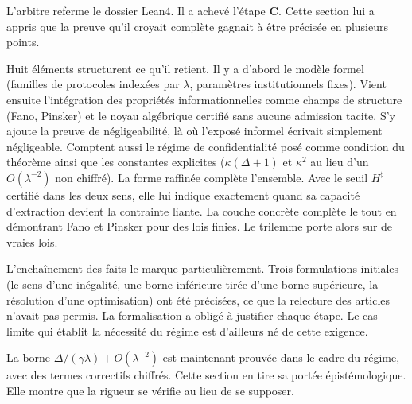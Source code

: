 \begin{boiteArbitre}
L'arbitre referme le dossier Lean4. Il a achev\'e l'\'etape \textbf{C}.
Cette section lui a appris que la preuve qu'il croyait compl\`ete gagnait
\`a \^etre pr\'ecis\'ee en plusieurs points.

Huit \'el\'ements structurent ce qu'il retient. Il y a d'abord le mod\`ele formel
(familles de protocoles index\'ees par $\lambda$, param\`etres institutionnels
fixes). Vient ensuite l'int\'egration des propri\'et\'es informationnelles comme champs de
structure (Fano, Pinsker) et le noyau alg\'ebrique certifi\'e sans aucune
admission tacite. S'y ajoute la preuve de n\'egligeabilit\'e, l\`a o\`u l'expos\'e
informel \'ecrivait simplement \og n\'egligeable\fg. Comptent aussi le r\'egime de confidentialit\'e
pos\'e comme condition du th\'eor\`eme ainsi que les constantes explicites
($\kappa(\Delta+1)$ et $\kappa^2$ au lieu d'un $O(\lambda^{-2})$ non chiffr\'e). La
forme raffin\'ee compl\`ete l'ensemble. Avec le seuil $H^\sharp$ certifi\'e dans les deux
sens, elle lui indique exactement quand sa capacit\'e
d'extraction devient la contrainte liante. La couche concr\`ete compl\`ete le tout en
d\'emontrant Fano et Pinsker pour des lois finies. Le trilemme porte alors sur
de vraies lois.

L'encha\^inement des faits le marque particuli\`erement. Trois formulations
initiales (le sens d'une in\'egalit\'e, une borne inf\'erieure tir\'ee d'une borne
sup\'erieure, la r\'esolution d'une optimisation) ont \'et\'e pr\'ecis\'ees, ce que
la relecture des articles n'avait pas permis. La formalisation a oblig\'e \`a
justifier chaque \'etape. Le cas limite qui \'etablit la n\'ecessit\'e du
r\'egime est d'ailleurs n\'e de cette exigence.

La borne $\Delta/(\gamma\lambda) + O(\lambda^{-2})$ est maintenant prouv\'ee dans le
cadre du r\'egime, avec des termes correctifs chiffr\'es. Cette section en tire sa
port\'ee \'epist\'emologique. Elle montre que la rigueur se v\'erifie au lieu
de se supposer.
\end{boiteArbitre}